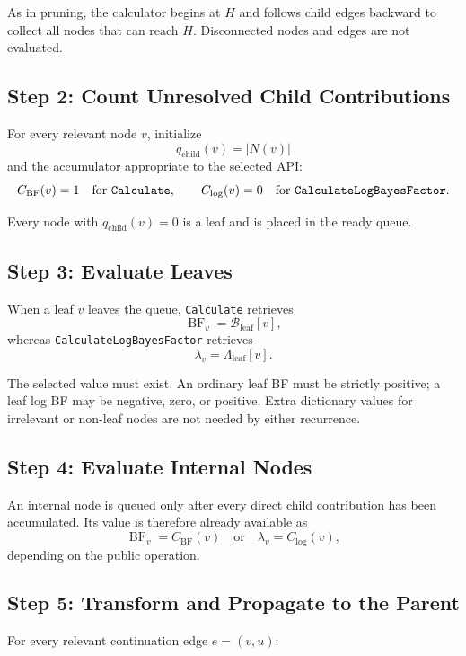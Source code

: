 \documentclass[11pt]{article}
\newcommand{\BF}{\operatorname{BF}}
\begin{document}
As in pruning, the calculator begins at \(H\) and follows child edges backward
to collect all nodes that can reach \(H\).  Disconnected nodes and edges are
not evaluated.

\subsection{Step 2: Count Unresolved Child Contributions}

For every relevant node \(v\), initialize
\[
    q_{\mathrm{child}}(v)=|N(v)|
\]
and the accumulator appropriate to the selected API:
\[
    C_{\BF}(v)=1
    \quad\text{for \texttt{Calculate}},
    \qquad
    C_{\log}(v)=0
    \quad\text{for \texttt{CalculateLogBayesFactor}}.
\]

Every node with \(q_{\mathrm{child}}(v)=0\) is a leaf and is placed in the
ready queue.

\subsection{Step 3: Evaluate Leaves}

When a leaf \(v\) leaves the queue, \texttt{Calculate} retrieves
\[
    \BF_v=\mathcal{B}_{\mathrm{leaf}}[v],
\]
whereas \texttt{CalculateLogBayesFactor} retrieves
\[
    \lambda_v=\Lambda_{\mathrm{leaf}}[v].
\]

The selected value must exist.  An ordinary leaf BF must be strictly positive;
a leaf log BF may be negative, zero, or positive.  Extra dictionary values for
irrelevant or non-leaf nodes are not needed by either recurrence.

\subsection{Step 4: Evaluate Internal Nodes}

An internal node is queued only after every direct child contribution has been
accumulated.  Its value is therefore already available as
\[
    \BF_v=C_{\BF}(v)
    \quad\text{or}\quad
    \lambda_v=C_{\log}(v),
\]
depending on the public operation.

\subsection{Step 5: Transform and Propagate to the Parent}

For every relevant continuation edge \(e=(v,u)\):
\end{document}

